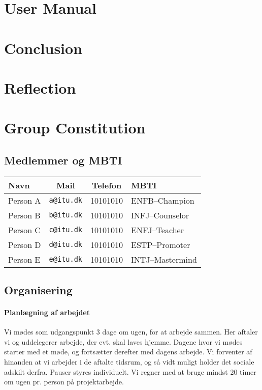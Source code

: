 \documentclass[11pt]{article}
\begin{document}
\section{User Manual}\label{sec:manual}

\section{Conclusion}\label{sec:conclusion}

\section{Reflection}\label{sec:reflection}

\appendix

\section{Group Constitution}

\subsection{Medlemmer og MBTI}

\begin{table}[h!]
    \centering
    \begin{tabular}{l c c l}
        \textbf{Navn} & \textbf{Mail} & \textbf{Telefon} & \textbf{MBTI} \\ \hline
        Person A & \texttt{a@itu.dk} & 10101010 & ENFB--Champion \\ 
        Person B & \texttt{b@itu.dk} & 10101010 & INFJ--Counselor \\ 
        Person C & \texttt{c@itu.dk} & 10101010 & ENFJ--Teacher \\ 
        Person D & \texttt{d@itu.dk} & 10101010 & ESTP--Promoter \\ 
        Person E & \texttt{e@itu.dk} & 10101010 & INTJ--Mastermind \\ 
    \end{tabular}
\end{table}

\subsection{Organisering}

\paragraph{Planlægning af arbejdet}
Vi mødes som udgangspunkt 3 dage om ugen, for at arbejde sammen. Her aftaler vi og uddelegerer arbejde, der evt. skal laves hjemme.
Dagene hvor vi mødes starter med et møde, og fortsætter derefter med dagens arbejde.
Vi forventer af hinanden at vi arbejder i de aftalte tidsrum, og så vidt muligt holder det sociale adskilt derfra. Pauser styres individuelt.
Vi regner med at bruge mindst 20 timer om ugen pr. person på projektarbejde.
\end{document}
